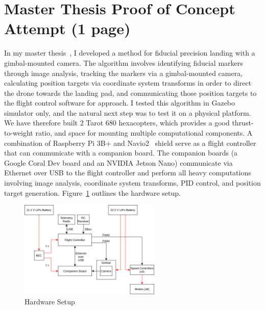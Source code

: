 \section{Master Thesis Proof of Concept Attempt (1 page)}
\label{section:initial_hexacopters}

In my master thesis~\cite{joshua_master_thesis}, I developed a method for fiducial precision landing with a gimbal-mounted camera.
The algorithm involves identifying fiducial markers through image analysis,
tracking the markers via a gimbal-mounted camera,
calculating position targets via coordinate system transforms in order to direct the drone towards the landing pad,
and communicating those position targets to the flight control software for approach.
I tested this algorithm in Gazebo simulator only, and the natural next step was to test it on a physical platform.
We have therefore built 2 Tarot 680 hexacopters,
which provides a good thrust-to-weight ratio,
and space for mounting multiple computational components.
A combination of Raspberry Pi 3B+ and Navio2~\cite{navio2_website} shield serve as a flight controller
that can communicate with a companion board.
The companion boards (a Google Coral Dev board and an NVIDIA Jetson Nano) communicate via Ethernet over USB to the flight
controller and perform all heavy computations involving image analysis, coordinate system transforms, PID control,
and position target generation.
Figure~\ref{figure:hardware_setup} outlines the hardware setup.

\begin{figure}
    \centering
    \includegraphics[width=0.6\textwidth]{images/hardware.png}
    \caption{Hardware Setup}
    \label{figure:hardware_setup}
\end{figure}

